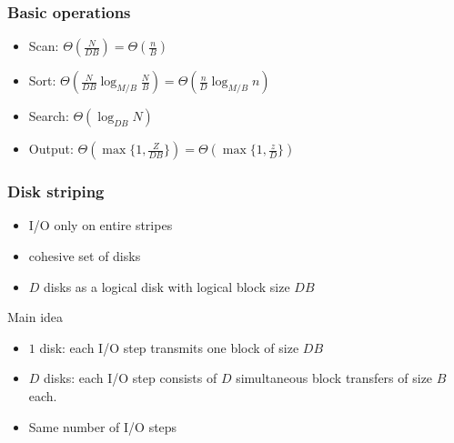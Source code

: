 \documentclass[12pt,aspectratio=169]{beamer}
\begin{document}
\begin{frame}\frametitle{Basic operations}
  \begin{itemize}
  \item
    Scan: $\Theta(\frac{N}{DB})=\Theta(\frac{n}{B})$
  \item
    Sort: $\Theta(\frac{N}{DB} \log_{M/B} \frac{N}{B}) = \Theta(\frac{n}{D} \log_{M/B} n)$
  \item
    Search: $\Theta(\log_{DB}N)$
  \item
    Output: $\Theta(\max\{1, \frac{Z}{DB}\}) = \Theta(\max\{1, \frac{z}{D}\})$
  \end{itemize}
\end{frame}


\begin{frame}\frametitle{Disk striping}
  \begin{itemize}
  \item
    I/O only on entire stripes
  \item
    cohesive set of disks
  \item
    $D$ disks as a logical disk with logical block size $DB$
  \end{itemize}
  \begin{block}{Main idea}
    \begin{itemize}
    \item
$1$ disk: each I/O step transmits one block of size $DB$
\item
$D$ disks: each I/O step consists of $D$
simultaneous block transfers of size $B$
each.
\item
  Same number of I/O steps
\end{itemize}
\end{block}
\end{frame}




\end{document}
